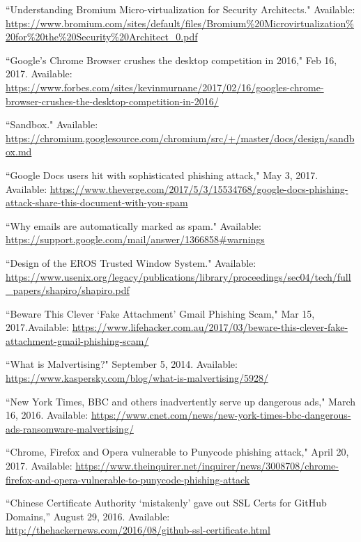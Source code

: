 \begin{thebibliography}{99}
\begin{singlespace}
``Understanding Bromium\textsuperscript{\textregistered} Micro-virtualization for Security Architects." Available:
\url{https://www.bromium.com/sites/default/files/Bromium\%20Microvirtualization\%20for\%20the\%20Security\%20Architect_0.pdf}

``Google's Chrome Browser crushes the desktop competition in 2016," Feb 16, 2017. Available: \url{https://www.forbes.com/sites/kevinmurnane/2017/02/16/googles-chrome-browser-crushes-the-desktop-competition-in-2016/}

``Sandbox." Available: \url{https://chromium.googlesource.com/chromium/src/+/master/docs/design/sandbox.md}

``Google Docs users hit with sophisticated phishing attack," May 3, 2017. Available: \url{https://www.theverge.com/2017/5/3/15534768/google-docs-phishing-attack-share-this-document-with-you-spam}

``Why emails are automatically marked as spam." Available: \url{https://support.google.com/mail/answer/1366858#warnings}

``Design of the EROS Trusted Window System." Available: \url{https://www.usenix.org/legacy/publications/library/proceedings/sec04/tech/full_papers/shapiro/shapiro.pdf}

``Beware This Clever `Fake Attachment' Gmail Phishing Scam," Mar 15, 2017.Available: \url{https://www.lifehacker.com.au/2017/03/beware-this-clever-fake-attachment-gmail-phishing-scam/}

``What is Malvertising?" September 5, 2014. Available: \url{https://www.kaspersky.com/blog/what-is-malvertising/5928/}

``New York Times, BBC and others inadvertently serve up dangerous ads," March 16, 2016. Available: \url{https://www.cnet.com/news/new-york-times-bbc-dangerous-ads-ransomware-malvertising/}


``Chrome, Firefox and Opera vulnerable to Punycode phishing attack," April 20, 2017. Available: \url{https://www.theinquirer.net/inquirer/news/3008708/chrome-firefox-and-opera-vulnerable-to-punycode-phishing-attack}

``Chinese Certificate Authority `mistakenly' gave out SSL Certs for GitHub Domains,'' August 29, 2016. Available: \url{http://thehackernews.com/2016/08/github-ssl-certificate.html}


\end{singlespace}
\end{thebibliography}
